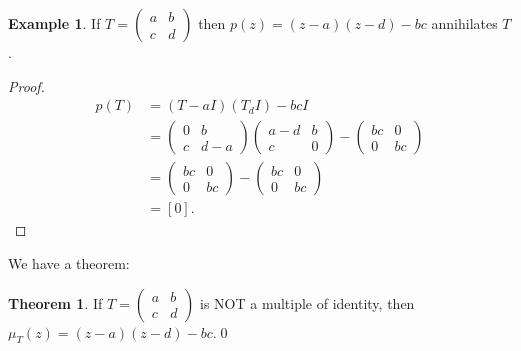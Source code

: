 \documentclass{book}
\theoremstyle{definition}
\newtheorem{exmp}{Example}[section]
\newtheorem{thm}{Theorem}[section]
\begin{document}
\begin{exmp}
	If $T = \begin{pmatrix}
	a&b\\c&d
	\end{pmatrix}$ then $p(z) = (z-a)(z-d) - bc$ annihilates $T$. 
	
	\begin{proof}
		\begin{align*}
		p(T) &= (T-aI)(T_dI) - bcI\\
		&= \begin{pmatrix}
		0 & b\\c & d-a
		\end{pmatrix}
		\begin{pmatrix}
		a-d&b\\c& 0
		\end{pmatrix}
		-
		\begin{pmatrix}
		bc & 0\\0 & bc
		\end{pmatrix}\\
		&=
		\begin{pmatrix}
		bc & 0\\0 & bc
		\end{pmatrix}
		-
		\begin{pmatrix}
		bc & 0\\0 & bc
		\end{pmatrix}\\
		&= [0].
		\end{align*}
	\end{proof}
\end{exmp}

We have a theorem:

\begin{thm}
	If $T = \begin{pmatrix}
	a&b\\c&d
	\end{pmatrix}$ is NOT a multiple of identity, then $\mu_T(z) = (z-a)(z-d) - bc$.\qed
\end{thm}
\end{document}
